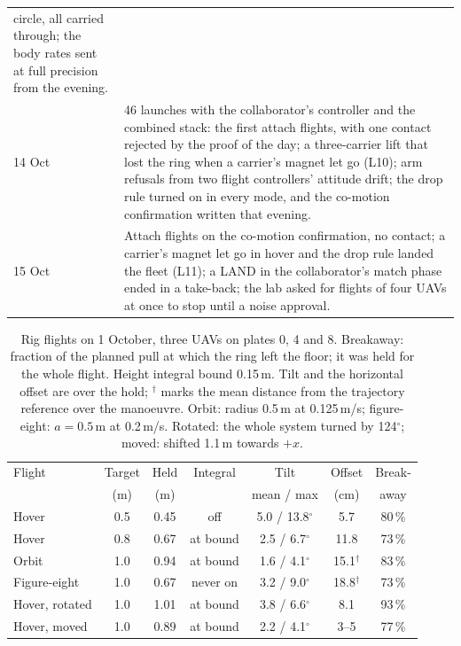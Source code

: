\begin{table}[h]
\begin{tabularx}{\textwidth}{lX}
circle, all carried through; the body rates sent at full precision from the evening. \\
14 Oct & 46 launches with the collaborator's controller and the combined stack: the first attach flights, with one
contact rejected by the proof of the day; a three-carrier lift that lost the ring when a carrier's magnet let go
(L10); arm refusals from two flight controllers' attitude drift; the drop rule turned on in every mode, and the
co-motion confirmation written that evening. \\
15 Oct & Attach flights on the co-motion confirmation, no contact; a carrier's magnet let go in hover and the drop
rule landed the fleet (L11); a LAND in the collaborator's match phase ended in a take-back; the lab asked for flights
of four UAVs at once to stop until a noise approval. \\
\bottomrule
\end{tabularx}
\end{table}

\begin{table}[h]
\centering
\small
\caption{Rig flights on 1 October, three UAVs on plates 0, 4 and 8. Breakaway: fraction of the planned
pull at which the ring left the floor; it was held for the whole flight. Height integral bound
0.15\,m. Tilt and the horizontal offset are over the hold; $^{\dagger}$ marks the mean distance from
the trajectory reference over the manoeuvre. Orbit: radius 0.5\,m at 0.125\,m/s; figure-eight:
$a = 0.5$\,m at 0.2\,m/s. Rotated: the whole system turned by 124$^\circ$; moved: shifted 1.1\,m
towards $+x$.}
\label{tab:rig_oct1}
\footnotesize
\begin{tabularx}{\textwidth}{>{\raggedright\arraybackslash}Xcccccc}
\toprule
Flight & Target & Held & Integral & Tilt & Offset & Break- \\
 & (m) & (m) & & mean / max & (cm) & away \\
\midrule
Hover & 0.5 & 0.45 & off & 5.0 / 13.8$^\circ$ & 5.7 & 80\,\% \\
Hover & 0.8 & 0.67 & at bound & 2.5 / 6.7$^\circ$ & 11.8 & 73\,\% \\
Orbit & 1.0 & 0.94 & at bound & 1.6 / 4.1$^\circ$ & 15.1$^{\dagger}$ & 83\,\% \\
Figure-eight & 1.0 & 0.67 & never on & 3.2 / 9.0$^\circ$ & 18.8$^{\dagger}$ & 73\,\% \\
Hover, rotated & 1.0 & 1.01 & at bound & 3.8 / 6.6$^\circ$ & 8.1 & 93\,\% \\
Hover, moved & 1.0 & 0.89 & at bound & 2.2 / 4.1$^\circ$ & 3--5 & 77\,\% \\
\bottomrule
\end{tabularx}
\end{table}

